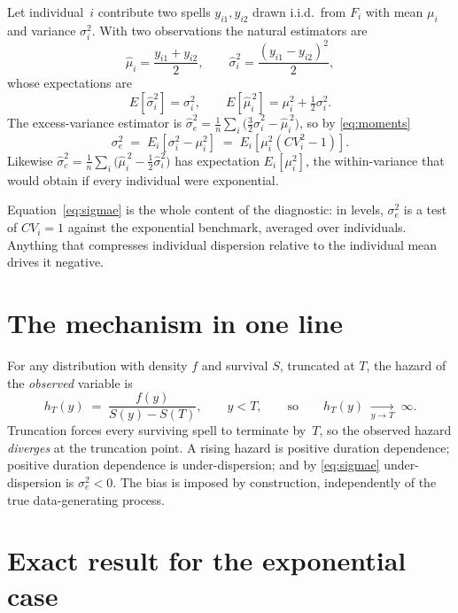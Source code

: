 \documentclass[11pt,a4paper]{article}
\begin{document}
Let individual~$i$ contribute two spells $y_{i1}, y_{i2}$ drawn i.i.d.\ from
$F_i$ with mean $\mu_i$ and variance $\sigma^2_i$.  With two observations the
natural estimators are
\[
  \hat\mu_i = \frac{y_{i1}+y_{i2}}{2},
  \qquad
  \hat\sigma^2_i = \frac{(y_{i1}-y_{i2})^2}{2},
\]
whose expectations are
\begin{equation}
  E[\hat\sigma^2_i] = \sigma^2_i,
  \qquad
  E[\hat\mu_i^{\,2}] = \mu_i^2 + \tfrac{1}{2}\sigma^2_i .
  \label{eq:moments}
\end{equation}
The excess-variance estimator is
$\hat\sigma^2_e = \frac{1}{n}\sum_i \bigl(\tfrac{3}{2}\hat\sigma^2_i - \hat\mu_i^{\,2}\bigr)$,
so by \eqref{eq:moments}
\begin{equation}
  \boxed{\;
  \sigma^2_e \;=\; E_i\!\left[\sigma^2_i - \mu_i^2\right]
  \;=\; E_i\!\left[\mu_i^2\left(CV_i^2 - 1\right)\right].
  \;}
  \label{eq:sigmae}
\end{equation}
Likewise
$\hat\sigma^2_c = \frac{1}{n}\sum_i\bigl(\hat\mu_i^{\,2}-\tfrac12\hat\sigma^2_i\bigr)$
has expectation $E_i[\mu_i^2]$, the within-variance that would obtain if
every individual were exponential.

Equation~\eqref{eq:sigmae} is the whole content of the diagnostic: in levels,
$\sigma^2_e$ is a test of $CV_i = 1$ against the exponential benchmark,
averaged over individuals.  Anything that compresses individual dispersion
relative to the individual mean drives it negative.

\section{The mechanism in one line}

For any distribution with density $f$ and survival $S$, truncated at $T$, the
hazard of the \emph{observed} variable is
\begin{equation}
  h_T(y) \;=\; \frac{f(y)}{S(y) - S(T)},
  \qquad y < T,
  \qquad\text{so}\qquad
  h_T(y) \;\xrightarrow[y \to T]{}\; \infty .
  \label{eq:hazard}
\end{equation}
Truncation forces every surviving spell to terminate by~$T$, so the observed
hazard \emph{diverges} at the truncation point.  A rising hazard is positive
duration dependence; positive duration dependence is under-dispersion; and by
\eqref{eq:sigmae} under-dispersion is $\sigma^2_e < 0$.  The bias is imposed
by construction, independently of the true data-generating process.

\section{Exact result for the exponential case}
\end{document}
